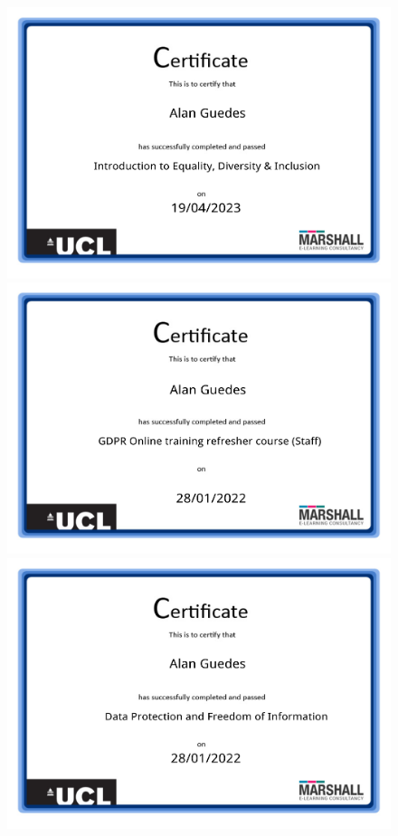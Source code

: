 \documentclass[10pt,a4paper,sans,colorlinks]{moderncv}
\begin{document}
\begin{figure}
    \centering \includegraphics[align=t,width=\textwidth,height=0.22\textheight, keepaspectratio=true]{certificates/EDI.pdf}
    \centering \includegraphics[align=t,width=\textwidth,height=0.22\textheight, keepaspectratio=true]{certificates/GDPR.pdf}
    \centering \includegraphics[align=t,width=\textwidth,height=0.22\textheight, keepaspectratio=true]{certificates/Data_Protection_and_Freedom_information.pdf}

\end{figure}
\end{document}
